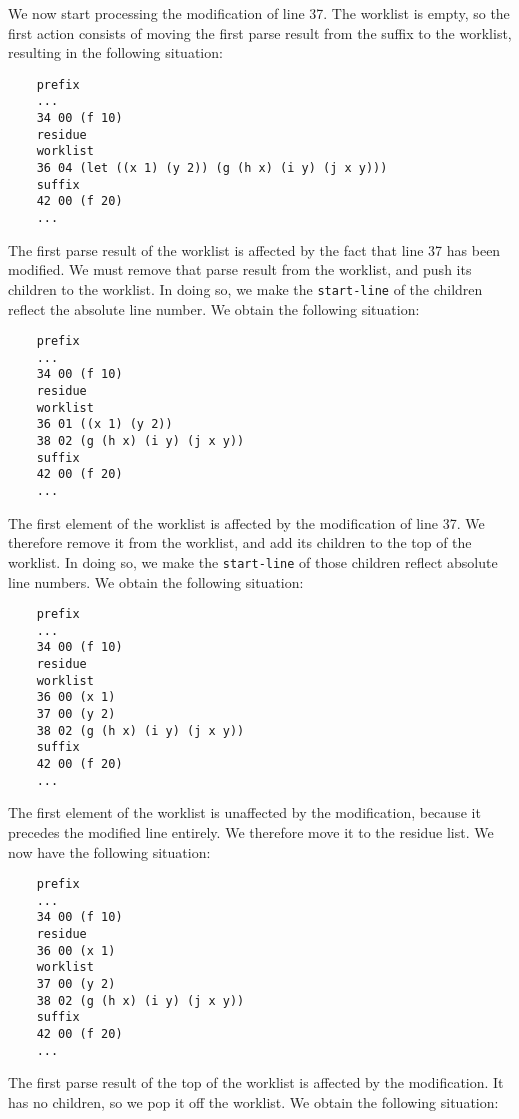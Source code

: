 We now start processing the modification of line 37.  The worklist is
empty, so the first action consists of moving the first parse result
from the suffix to the worklist, resulting in the following situation:

{\small\begin{verbatim}
    prefix
    ...
    34 00 (f 10)
    residue
    worklist
    36 04 (let ((x 1) (y 2)) (g (h x) (i y) (j x y)))
    suffix
    42 00 (f 20)
    ...
\end{verbatim}}

The first parse result of the worklist is affected by the fact that
line 37 has been modified.  We must remove that parse result from the
worklist, and push its children to the worklist.  In doing so, we make
the \texttt{start-line} of the children reflect the absolute line
number.  We obtain the following situation:

{\small\begin{verbatim}
    prefix
    ...
    34 00 (f 10)
    residue
    worklist
    36 01 ((x 1) (y 2))
    38 02 (g (h x) (i y) (j x y))
    suffix
    42 00 (f 20)
    ...
\end{verbatim}}

The first element of the worklist is affected by the modification of
line 37.  We therefore remove it from the worklist, and add its
children to the top of the worklist.  In doing so, we make the
\texttt{start-line} of those children reflect absolute line numbers.
We obtain the following situation:

{\small\begin{verbatim}
    prefix
    ...
    34 00 (f 10)
    residue
    worklist
    36 00 (x 1)
    37 00 (y 2)
    38 02 (g (h x) (i y) (j x y))
    suffix
    42 00 (f 20)
    ...
\end{verbatim}}

The first element of the worklist is unaffected by the modification,
because it precedes the modified line entirely.  We therefore move it
to the residue list.  We now have the following situation:

{\small\begin{verbatim}
    prefix
    ...
    34 00 (f 10)
    residue
    36 00 (x 1)
    worklist
    37 00 (y 2)
    38 02 (g (h x) (i y) (j x y))
    suffix
    42 00 (f 20)
    ...
\end{verbatim}}

The first parse result of the top of the worklist is affected by the
modification.  It has no children, so we pop it off the worklist.  We
obtain the following situation:

